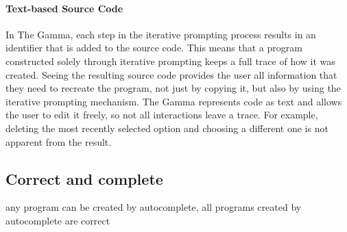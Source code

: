 \documentclass[manuscript,review,anonymous]{acmart}
\begin{document}
\paragraph{Text-based Source Code}
In The Gamma, each step in the iterative prompting process results in an identifier that is
added to the source code. This means that a program constructed solely through iterative prompting
keeps a full trace of how it was created. Seeing the resulting source code provides the user all
information that they need to recreate the program, not just by copying it, but also by using the
iterative prompting mechanism. The Gamma represents code as text and allows the user to edit it
freely, so not all interactions leave a trace. For example, deleting the most recently selected
option and choosing a different one is not apparent from the result.



\subsection{Correct and complete}
any program can be created by autocomplete, all programs created by autocomplete are correct


\newpage





~
\newpage

\end{document}
